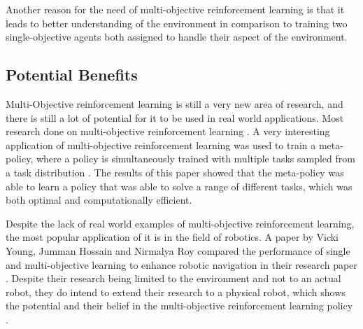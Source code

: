 Another reason for the need of multi-objective reinforcement learning is that it leads to better understanding of the environment in comparison to training two single-objective agents both assigned to handle their aspect of the environment. %


\subsection{Potential Benefits}

Multi-Objective reinforcement learning is still a very new area of research, and there is still a lot of potential for it to be used in real world applications. Most research done on multi-objective reinforcement learning . A very interesting application of multi-objective reinforcement learning was used to train a meta-policy, where a policy is simultaneously trained with multiple tasks sampled from a task distribution \cite{8968092}. The results of this paper showed that the meta-policy was able to learn a policy that was able to solve a range of different tasks, which was both optimal and computationally efficient. 

Despite the lack of real world examples of multi-objective reinforcement learning, the most popular application of it is in the field of robotics. A paper by Vicki Young, Jumman Hossain and Nirmalya Roy compared the performance of single and multi-objective learning to enhance robotic navigation in their research paper \cite{young2023enhancing}. Despite their research being limited to the environment and not to an actual robot, they do intend to extend their research to a physical robot, which shows the potential and their belief in the multi-objective reinforcement learning policy \cite{young2023enhancing}.